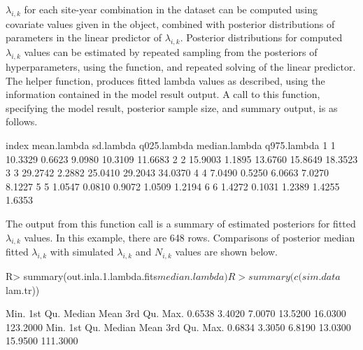 \documentclass[codesnippet]{jss}
\begin{document}
$\lambda_{i,k}$ for each site-year combination in the dataset can be 
computed using covariate values given in the  
object, combined with posterior distributions of parameters in the linear 
predictor of $\lambda_{i,k}$. Posterior distributions for computed 
$\lambda_{i,k}$ values can be estimated by repeated sampling from the 
posteriors of hyperparameters, using the  
function, and repeated solving of the linear predictor. The helper function, 
 produces fitted lambda values as described, 
using the information contained in the model result output. A call to this 
function, specifying the model result, posterior sample size, and summary 
output, is as follows.

\begin{CodeOutput}
  index mean.lambda sd.lambda  q025.lambda  median.lambda   q975.lambda
1     1     10.3329    0.6623       9.0980        10.3109       11.6683
2     2     15.9003    1.1895      13.6760        15.8649       18.3523
3     3     29.2742    2.2882      25.0410        29.2043       34.0370
4     4      7.0490    0.5250       6.0663         7.0270        8.1227
5     5      1.0547    0.0810       0.9072         1.0509        1.2194
6     6      1.4272    0.1031       1.2389         1.4255        1.6353
\end{CodeOutput}

The output from this function call is a summary of estimated posteriors for fitted $\lambda_{i,k}$ values. In this example, there are 648 rows. Comparisons of posterior median fitted $\lambda_{i,k}$ with simulated $\lambda_{i,k}$ and $N_{i,k}$ values are shown below.

\begin{CodeInput}
R> summary(out.inla.1.lambda.fits$median.lambda)
R> summary(c(sim.data$lam.tr))
\end{CodeInput}
\begin{CodeOutput}
  Min.   1st Qu.    Median     Mean    3rd Qu.       Max. 
0.6538    3.4020    7.0070  13.5200    16.0300   123.2000
  Min.   1st Qu.    Median     Mean    3rd Qu.       Max. 
0.6834    3.3050    6.8190  13.0300    15.9500   111.3000 
\end{CodeOutput}
\end{document}

